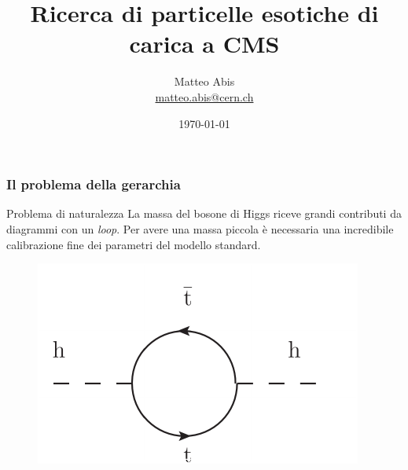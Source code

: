 \documentclass[italian]{beamer}
\title[Ricerca di partner del top]{Ricerca di particelle esotiche di carica
    \nicefrac{5}{3} a CMS}
\author{Matteo Abis\\
\url{matteo.abis@cern.ch}}
\institute{Università di Padova}
\date{\today}
\begin{document}
\begingroup
\begin{frame}
  \titlepage
\end{frame}
\endgroup
 
\begin{frame}
    \frametitle{Il problema della gerarchia}
    \begin{block}
        {Problema di naturalezza}
        La massa del bosone di Higgs riceve grandi contributi da diagrammi
        con un \emph{loop}. Per avere una massa piccola \`e
        necessaria una incredibile calibrazione fine dei parametri del
        modello standard. 
    \end{block}
    \begin{figure}[h]
        \centering
        \includegraphics[height=.4\textheight]{higgs_correction}
    \end{figure}
\end{frame}
\end{document}
